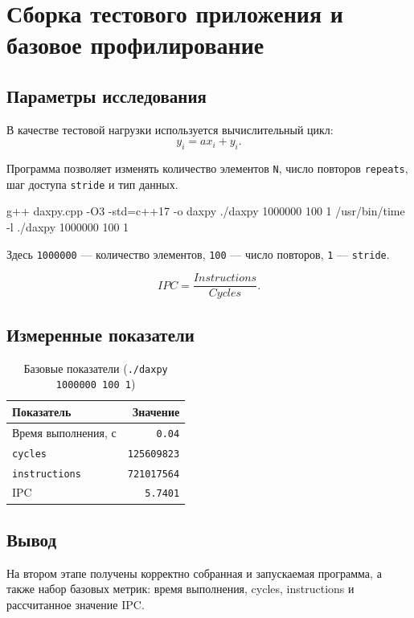 \chapter{Сборка тестового приложения и базовое профилирование}
\label{ch:baseline}

\section{Параметры исследования}

В качестве тестовой нагрузки используется вычислительный цикл:
$$
y_i = a x_i + y_i.
$$

Программа позволяет изменять количество элементов \texttt{N}, число повторов \texttt{repeats}, шаг доступа \texttt{stride} и тип данных.

\begin{commands}
g++ daxpy.cpp -O3 -std=c++17 -o daxpy
./daxpy 1000000 100 1
/usr/bin/time -l ./daxpy 1000000 100 1
\end{commands}

Здесь \texttt{1000000} --- количество элементов, \texttt{100} --- число повторов, \texttt{1} --- \texttt{stride}.

$$
\mathit{IPC} = \frac{\mathit{Instructions}}{\mathit{Cycles}}.
$$

\section{Измеренные показатели}

\begin{table}[H]
\caption{Базовые показатели (\texttt{./daxpy 1000000 100 1})}
\label{tab:baseline}
\begin{tabularx}{\textwidth}{|X|r|}
	\hline
	Показатель & Значение \\
	\hline
	Время выполнения, с & \texttt{0.04} \\
	\hline
	\texttt{cycles} & \texttt{125609823} \\
	\hline
	\texttt{instructions} & \texttt{721017564} \\
	\hline
	IPC & \texttt{5.7401} \\
	\hline
\end{tabularx}
\end{table}

\section{Вывод}

На втором этапе получены корректно собранная и запускаемая программа, а также набор базовых метрик: время выполнения, cycles, instructions и рассчитанное значение IPC.
